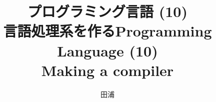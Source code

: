 \documentclass[12pt,dvipdfmx]{beamer}
\title{プログラミング言語 (10) \\ 言語処理系を作る}
\title{Programming Language (10) \\ Making a compiler}
\institute{}
\author{田浦}
\date{}
\newif\ifen
\newif\ifja
\newcommand{\ao}[1]{{\color{blue}#1}}
\begin{document}
\maketitle

\begin{frame}
\ifja
\frametitle{目次}
\fi
\ifen
\frametitle{Contents}
\fi
\tableofcontents
\end{frame}

\iffalse
\ifja
\begin{frame}
\frametitle{言語処理系実装の形態}
\begin{itemize}
\item \ao{インタプリタ:} プログラムを解釈実行(プログラムと入力から出力を直接計算)
\item \ao{トランスレータ:} プログラムを別の言語(例: C)に翻訳
  \begin{itemize}
  \item 例: OpenMP (Cの並列拡張) を C (+ Pthreads) に翻訳
  \end{itemize}
\item \ao{コンパイラ:} プログラムを機械語に翻訳
\end{itemize}
\end{frame}
\fi

\ifen
\begin{frame}
\frametitle{Various forms of language implementation}
\begin{itemize}
\item \ao{interpreter:} interprets and executes programs
  (takes a program and an input; and computes the output)
\item \ao{translator (transpiler):} translates programs into another language (e.g., C)
  \begin{itemize}
  \item e.g. translate OpenMP (parallel extension to C) to C (+ Pthreads)
  \end{itemize}
\item \ao{compiler:} translates programs into \ao{a machine (assembly) code}
\end{itemize}
\end{frame}
\fi

\iffalse
\begin{frame}
\frametitle{言語処理系実装の形態}
\begin{itemize}
\item インタプリタ: interp(プログラム, 入力) = 出力
\item トランスレータ・コンパイラ: compile(プログラム) = プログラム' ; プログラム'(入力) = 出力
\end{itemize}
\end{frame}
\fi
\end{document}
